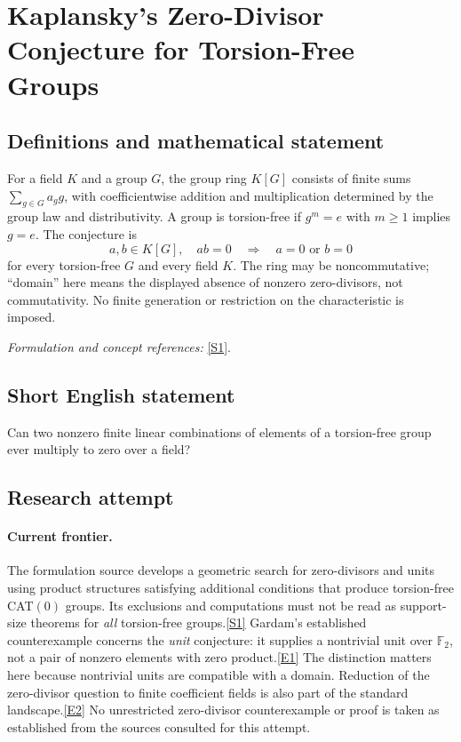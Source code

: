 \documentclass[11pt,a4paper]{article}
\newcommand{\F}{\mathbb{F}}
\newcommand{\sref}[2]{\hyperlink{source:#1:#2}{[S#2]}}
\newcommand{\eref}[2]{\hyperlink{extra:#1:#2}{[E#2]}}
\newif\ifshowcatalogue
\newcommand{\cataloguescope}[1]{\ifshowcatalogue
 \paragraph{Exact scope in the supplied catalogue.}
 \begin{quote}\small #1\end{quote}\fi}
\begin{document}
\setcounter{section}{0}
\clearpage
\section*{\texorpdfstring{Kaplansky's Zero-Divisor Conjecture for Torsion-Free Groups}{Kaplansky's Zero-Divisor Conjecture for Torsion-Free Groups}}\label{statement}
\subsection{Definitions and mathematical statement}
For a field $K$ and a group $G$, the group ring $K[G]$ consists of finite sums $\sum_{g\in G}a_gg$, with coefficientwise addition and multiplication determined by the group law and distributivity. A group is torsion-free if $g^m=e$ with $m\ge1$ implies $g=e$. The conjecture is
\[
 a,b\in K[G],\quad ab=0\quad\Longrightarrow\quad a=0\text{ or }b=0
\]
for every torsion-free $G$ and every field $K$. The ring may be noncommutative; ``domain'' here means the displayed absence of nonzero zero-divisors, not commutativity. No finite generation or restriction on the characteristic is imposed.
\par\smallskip\textit{Formulation and concept references:} \sref{statement}{1}.
\cataloguescope{Prove that for every torsion-free group G and every field K, the group ring K[G] has no non-trivial zero-divisors, i.e. K[G] is a domain.}
\subsection{Short English statement}
Can two nonzero finite linear combinations of elements of a torsion-free group ever multiply to zero over a field?
\subsection{Research attempt}

\paragraph{Current frontier.}
The formulation source develops a geometric search for zero-divisors and
units using product structures satisfying additional conditions that
produce torsion-free CAT$(0)$ groups. Its exclusions and computations
must not be read as support-size theorems for \emph{all} torsion-free
groups.\sref{statement}{1}
Gardam's established counterexample concerns the \emph{unit} conjecture:
it supplies a nontrivial unit over $\F_2$, not a pair of nonzero elements
with zero product.\eref{statement}{1}
The distinction matters here because nontrivial units are compatible with
a domain. Reduction of the zero-divisor question to finite coefficient
fields is also part of the standard landscape.\eref{statement}{2}
No unrestricted zero-divisor counterexample or proof is taken as established
from the sources consulted for this attempt.
\end{document}
